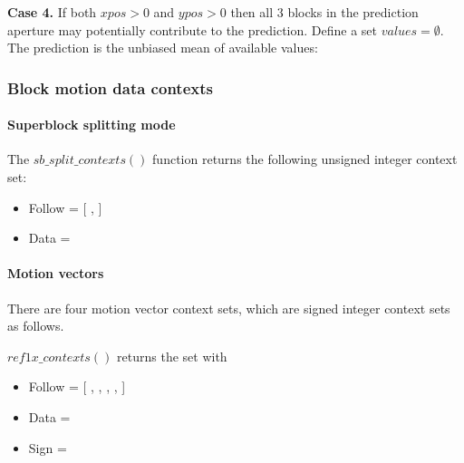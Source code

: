{\bf Case 4.} If both $xpos>0$ and $ypos>0$ then all 3 blocks in the prediction aperture may potentially
contribute to the prediction. Define a set $values=\emptyset$. The prediction is the 
unbiased mean of available values:

\begin{pseudo*}
    \bsIF{\BlockData[ypos][xpos-1][mode]==\Intra}
    \bsEND
    \bsIF{\BlockData[ypos-1][xpos][mode]==\Intra}
    \bsEND
    \bsIF{\BlockData[ypos-1][xpos-1][mode]==\Intra}
    \bsEND

    \bsELSE
    \bsEND
\bsEND
\end{pseudo*}


\subsubsection{Block motion data contexts}

\paragraph{Superblock splitting mode\\}

The $sb\_split\_contexts()$ function returns the following unsigned integer context set:

\begin{itemize}
\item Follow = [ \SBSplitFollowOne, \SBSplitFollowTwo ]
\item Data = \SBSplitData
\end{itemize}

\paragraph{Motion vectors\\}
\label{mvcontexts}

There are four motion vector context sets, which are signed integer context sets as follows.

$ref1x\_contexts()$ returns the set with
\begin{itemize}
\item Follow = [ \RefOnexFollowOne, \RefOnexFollowTwo, \RefOnexFollowThree, \RefOnexFollowFour, \RefOnexFollowFivePlus ]
\item Data = \RefOnexData
\item Sign = \RefOnexSign
\end{itemize}


